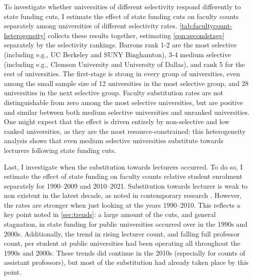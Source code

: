 To investigate whether universities of different selectivity respond differently to state funding cuts, I estimate the effect of state funding cuts on faculty counts separately among universities of different selectivity rates.
\autoref{tab:facultycount-heterogeneity} collects these results together, estimating \autoref{eqn:secondstage} separately by the \cite{barrons2009} selectivity rankings.
Barrons rank 1-2 are the most selective (including e.g., UC Berkeley and SUNY Binghamton), 3-4 medium selective (including e.g., Clemson University and University of Dallas), and rank 5 for the rest of universities.
The first-stage is strong in every group of universities, even among the small sample size of 12 universities in the most selective group, and 28 universities in the next selective group.
Faculty substitution rates are not distinguishable from zero among the most selective universities, but are positive and similar between both medium selective universities and unranked universities.
One might expect that the effect is driven entirely by non-selective and low ranked universities, as they are the most resource-constrained;
this heterogeneity analysis shows that even medium selective universities substitute towards lecturers following state funding cuts.

Last, I investigate when the substitution towards lecturers occurred.
To do so, I estimate the effect of state funding on faculty counts relative student enrolment separately for 1990--2009 and 2010--2021.
Substitution towards lecturer is weak to non existent in the latest decade, as noted in contemporary research \citep{hinrichs2022state}.
However, the rates are stronger when just looking at the years 1990--2010.
This reflects a key point noted in \autoref{sec:trends}: a large amount of the cuts, and general stagnation, in state funding for public universities occurred over in the 1990s and 2000s.
Additionally, the trend in rising lecturer count, and falling full professor count, per student at public universities had been operating all throughout the 1990s and 2000s.
These trends did continue in the 2010s (especially for counts of assistant professors), but most of the substitution had already taken place by this point.
